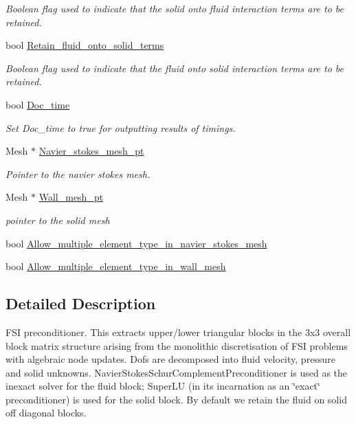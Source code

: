\begin{DoxyCompactItemize}
\begin{DoxyCompactList}\small\item\em Boolean flag used to indicate that the solid onto fluid interaction terms are to be retained. \end{DoxyCompactList}\item 
bool \hyperlink{classoomph_1_1FSIPreconditioner_ada9ff0aa8a1b15dea196a6d753ec740e}{Retain\+\_\+fluid\+\_\+onto\+\_\+solid\+\_\+terms}
\begin{DoxyCompactList}\small\item\em Boolean flag used to indicate that the fluid onto solid interaction terms are to be retained. \end{DoxyCompactList}\item 
bool \hyperlink{classoomph_1_1FSIPreconditioner_a405ccaf05553b1bf7702cb2f25df57e9}{Doc\+\_\+time}
\begin{DoxyCompactList}\small\item\em Set Doc\+\_\+time to true for outputting results of timings. \end{DoxyCompactList}\item 
Mesh $\ast$ \hyperlink{classoomph_1_1FSIPreconditioner_a201e3fcf3e13bd19b3871e9d3a734a1d}{Navier\+\_\+stokes\+\_\+mesh\+\_\+pt}
\begin{DoxyCompactList}\small\item\em Pointer to the navier stokes mesh. \end{DoxyCompactList}\item 
Mesh $\ast$ \hyperlink{classoomph_1_1FSIPreconditioner_ae86cf988796524f905c8d6edc942816a}{Wall\+\_\+mesh\+\_\+pt}
\begin{DoxyCompactList}\small\item\em pointer to the solid mesh \end{DoxyCompactList}\item 
bool \hyperlink{classoomph_1_1FSIPreconditioner_a4c015d18092bf2bfc1db075c74006e80}{Allow\+\_\+multiple\+\_\+element\+\_\+type\+\_\+in\+\_\+navier\+\_\+stokes\+\_\+mesh}
\item 
bool \hyperlink{classoomph_1_1FSIPreconditioner_a87e5a1cb279243414b1b0c2a5834efb5}{Allow\+\_\+multiple\+\_\+element\+\_\+type\+\_\+in\+\_\+wall\+\_\+mesh}
\end{DoxyCompactItemize}


\subsection{Detailed Description}
F\+SI preconditioner. This extracts upper/lower triangular blocks in the 3x3 overall block matrix structure arising from the monolithic discretisation of F\+SI problems with algebraic node updates. Dofs are decomposed into fluid velocity, pressure and solid unknowns. Navier\+Stokes\+Schur\+Complement\+Preconditioner is used as the inexact solver for the fluid block; Super\+LU (in its incarnation as an \char`\"{}exact\char`\"{} preconditioner) is used for the solid block. By default we retain the fluid on solid off diagonal blocks. 

